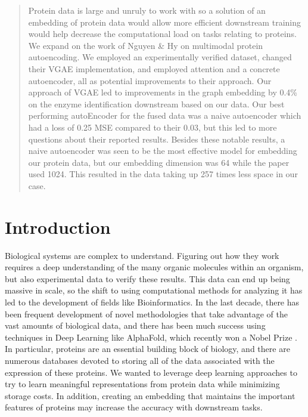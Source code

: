 \documentclass{article}
\begin{document}
\printAffiliationsAndNotice{}  %

\begin{abstract} 
Protein data is large and unruly to work with so a solution of an embedding of protein data would allow more efficient downstream training would help decrease the computational load on tasks relating to proteins. We expand on the work of Nguyen \& Hy on multimodal protein autoencoding. We employed an experimentally verified dataset, changed their VGAE implementation, and employed attention and a concrete autoencoder, all as potential improvements to their approach. Our approach of VGAE led to improvements in the graph embedding by 0.4\% on the enzyme identification downstream based on our data. Our best performing autoEncoder for the fused data was a naive autoencoder which had a loss of 0.25 MSE compared to their 0.03, but this led to more questions about their reported results. Besides these notable results, a naive autoencoder was seen to be the most effective model for embedding our protein data, but our embedding dimension was 64 while the paper used 1024. This resulted in the data taking up 257 times less space in our case.
\end{abstract} 

\section{Introduction}

Biological systems are complex to understand. Figuring out how they work requires a deep understanding of the many organic molecules within an organism, but also experimental data to verify these results. This data can end up being massive in scale, so the shift to using computational methods for analyzing it has led to the development of fields like Bioinformatics. In the last decade, there has been frequent development of novel methodologies that take advantage of the vast amounts of biological data, and there has been much success using techniques in Deep Learning like AlphaFold, which recently won a Nobel Prize \cite{alphafold}. In particular, proteins are an essential building block of biology, and there are numerous databases devoted to storing all of the data associated with the expression of these proteins. We wanted to leverage deep learning approaches to try to learn meaningful representations from protein data while minimizing storage costs. In addition, creating an embedding that maintains the important features of proteins may increase the accuracy with downstream tasks.
\end{document}
